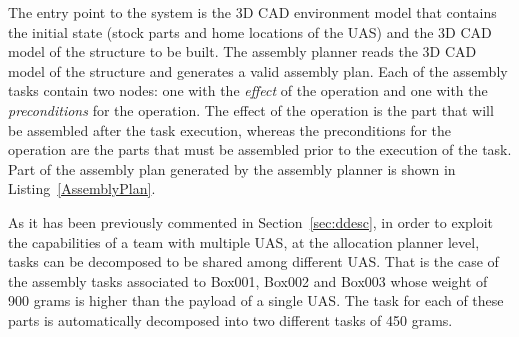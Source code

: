 \documentclass[letterpaper, 12pt, conference]{ieeeconf}    %
\begin{document}
The entry point to the system is the 3D CAD environment model that contains the initial state (stock parts and home locations of the UAS) and the 3D CAD model of the structure to be built. The assembly planner reads the 3D CAD model of the structure and generates a valid assembly plan. Each of the assembly tasks contain two nodes: one with the \textit{effect} of the operation and one with the \textit{preconditions} for the operation. The effect of the operation is the part that will be assembled after the task execution, whereas the preconditions for the operation are the parts that must be assembled prior to the execution of the task. Part of the assembly plan generated by the assembly planner is shown in Listing~\ref{AssemblyPlan}.



%

As it has been previously commented in Section~\ref{sec:ddesc}, in order to exploit the capabilities of a team with multiple UAS, at the allocation planner level, tasks can be decomposed to be shared among different UAS. That is the case of the assembly tasks associated to Box001, Box002 and Box003 whose weight of 900 grams is higher than the payload of a single UAS. The task for each of these parts is automatically decomposed into two different tasks of 450 grams. 
\end{document}
